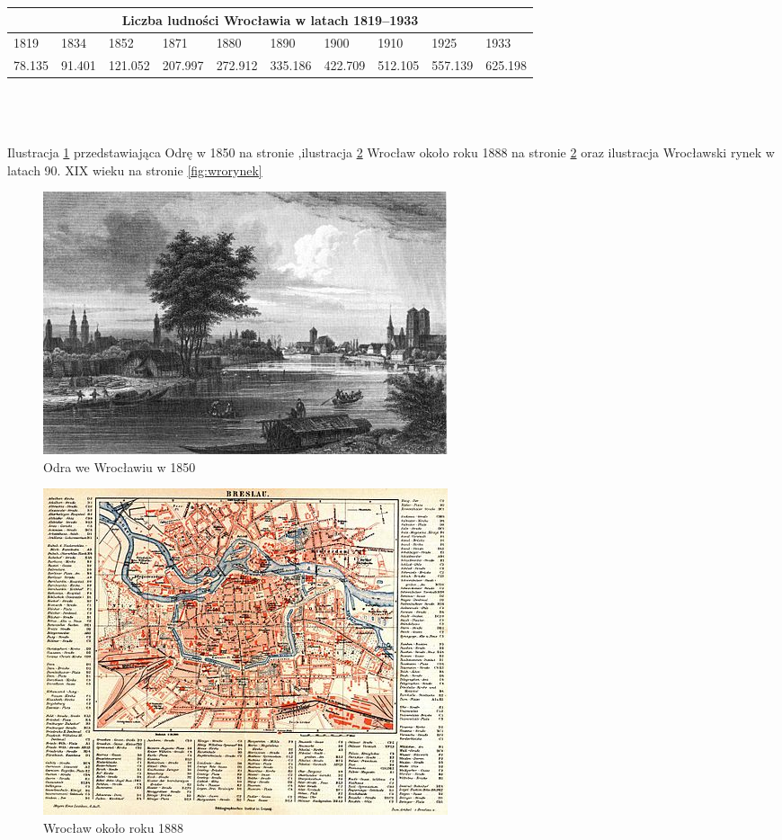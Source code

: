 \documentclass{article}
\begin{document}
\begin{tabular}{ |p{1cm}||p{1cm}|p{1cm}|p{1cm}||p{1cm}||p{1cm}|p{1cm}|p{1cm}||p{1cm}|p{1cm}| }
 \hline
 \multicolumn{10}{|c|}{Liczba ludności Wrocławia w latach 1819–1933} \\
 \hline
 1819&1834&1852&1871&1880&1890&1900&1910&1925&1933\\
 \hline
78.135 & 91.401 & 121.052 & 207.997 & 272.912 & 335.186 & 422.709 & 512.105 & 557.139 & 625.198\\
 \hline
\end{tabular}\\\\
\\

Ilustracja \ref{fig:odrawro} przedstawiająca Odrę w 1850 na stronie \pageref{fig:odrawro},ilustracja \ref{fig:wro1888} Wrocław około roku 1888 na stronie \ref{fig:wro1888} oraz ilustracja \label{fig:wrorynek} Wrocławski rynek w latach 90. XIX wieku na stronie \ref{fig:wrorynek}
\begin{figure}[h!]
\centering
\includegraphics[scale=1]{450px-Ansicht_Breslau_um_1850.jpg}
\caption{Odra we Wrocławiu w 1850}
\label{fig:odrawro}
\end{figure}
\begin{figure}[h!]
\centering
\includegraphics[scale=2]{450px-Meyers_b3_s0403a.jpg}
\caption{Wrocław około roku 1888}
\label{fig:wro1888}
\end{figure}
\end{document}
